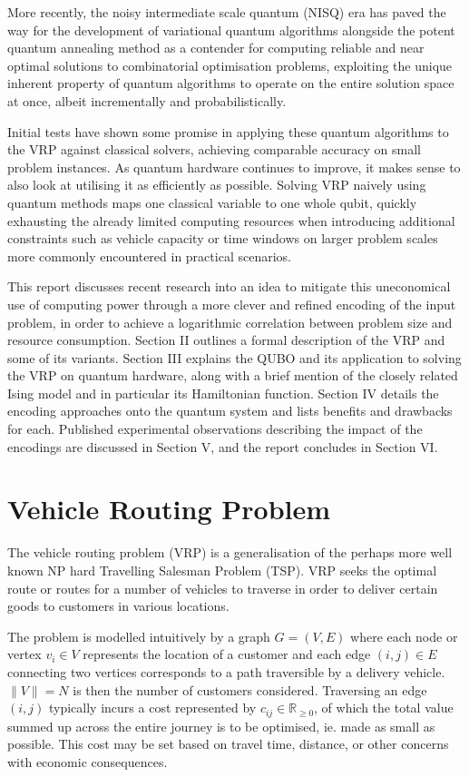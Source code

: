 \documentclass {article}
\begin{document}
More recently, the noisy intermediate scale quantum (NISQ) era has paved
the way for the development of variational quantum algorithms alongside the
potent quantum annealing method as a contender for computing reliable and
near optimal solutions to combinatorial optimisation problems, exploiting
the unique inherent property of quantum algorithms to operate on the
entire solution space at once, albeit incrementally and probabilistically.

Initial tests have shown some promise in applying these quantum algorithms
to the VRP against classical solvers, achieving comparable accuracy on
small problem instances. As quantum hardware continues to improve, it makes
sense to also look at utilising it as efficiently as possible. Solving VRP
naively using quantum methods maps one classical variable to one whole qubit,
quickly exhausting the already limited computing resources when introducing
additional constraints such as vehicle capacity or time windows on larger
problem scales more commonly encountered in practical scenarios.

This report discusses recent research into an idea to mitigate this
uneconomical use of computing power through a more clever and refined 
encoding of the input problem, in order to achieve a logarithmic correlation
between problem size and resource consumption.
Section II outlines a formal description of the VRP and some of its variants.
Section III explains the QUBO and its application to solving the VRP on
quantum hardware, along with a brief mention of the closely related
Ising model and in particular its Hamiltonian function.
Section IV details the encoding approaches onto the quantum system and lists
benefits and drawbacks for each.
Published experimental observations describing the impact of the encodings
are discussed in Section V,
and the report concludes in Section VI.

\section {Vehicle Routing Problem}
The vehicle routing problem (VRP) is a generalisation of the perhaps more
well known NP hard Travelling Salesman Problem (TSP). VRP seeks the optimal
route or routes for a number of vehicles to traverse in order to deliver
certain goods to customers in various locations.

The problem is modelled intuitively by a graph $G = (V, E)$
where each node or vertex $v_i \in V$ represents the location of a customer 
and each edge $(i, j) \in E$ connecting two vertices corresponds to a path
traversible by a delivery vehicle. $\lVert V \rVert = N$ is then the number
of customers considered. Traversing an edge $(i, j)$ typically incurs
a cost represented by $c_{ij} \in \mathbb R_{\ge 0}$, of which the total
value summed up across the entire journey is to be optimised, ie. made as
small as possible. This cost may be set based on travel time, distance,
or other concerns with economic consequences.
\end{document}

